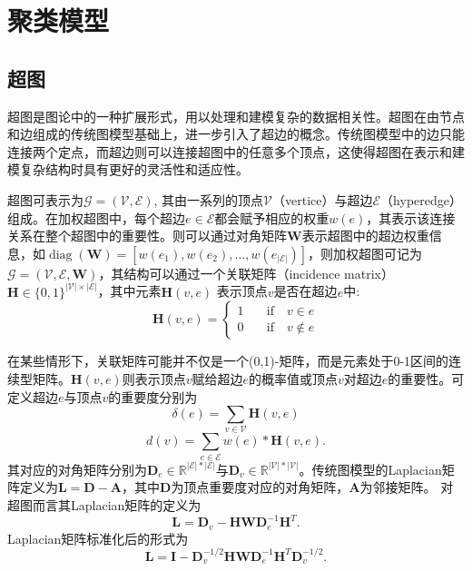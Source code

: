 \documentclass[lang=cn,10pt]{gorgeousnbook}
\numberwithin{equation}{section}%
\numberwithin{figure}{section}%
\begin{document}
\chapter{聚类模型}
\begin{center}
\end{center}
\section{超图}
超图是图论中的一种扩展形式，用以处理和建模复杂的数据相关性。超图在由节点和边组成的传统图模型基础上，进一步引入了超边的概念。传统图模型中的边只能连接两个定点，而超边则可以连接超图中的任意多个顶点，这使得超图在表示和建模复杂结构时具有更好的灵活性和适应性\cite{9264674}。

超图可表示为$\mathcal{G}=\left(\mathcal{V},\mathcal{E}\right)$, 其由一系列的顶点$\mathcal{V}$（vertice）与超边$\mathcal{E} $（hyperedge）组成。在加权超图中，每个超边$e\in\mathcal{E}$都会赋予相应的权重$w(e)$，其表示该连接关系在整个超图中的重要性。则可以通过对角矩阵$\mathbf{W}$表示超图中的超边权重信息，如$\operatorname{diag}(\mathbf{W})=[w(e_1),w(e_2),\ldots,w(e_{|\mathcal{E}|})]$，则加权超图可记为$\mathcal{G}=\left(\mathcal{V},\mathcal{E},\mathbf{W}\right)$，其结构可以通过一个关联矩阵（incidence matrix）$\mathbf{H}\in\{0,1\}^{|\mathcal{V}|\times|\mathcal{E}|}$，其中元素$\mathbf{H}(v,e)$ 表示顶点$v$是否在超边$e$中:
\begin{equation}
\mathbf{H}(v,e)=\left\{\begin{array}{cc}1&\quad\text{if}\quad v\in e\\0&\quad\text{if}\quad v\notin e\end{array}\right.
\end{equation}

在某些情形下，关联矩阵可能并不仅是一个(0,1)-矩阵，而是元素处于0-1区间的连续型矩阵。$\mathbf{H}(v,e)$则表示顶点$v$赋给超边$e$的概率值或顶点$v$对超边$e$的重要性。可定义超边$e$与顶点$v$的重要度分别为
\begin{equation}
\delta(e)=\sum_{v\in\mathcal{V}}\mathbf{H}(v,e)
\end{equation}
\begin{equation}
d(v)=\sum_{e\in\mathcal{E}}w(e)*\mathbf{H}(v,e).
\end{equation}
其对应的对角矩阵分别为$\mathbf{D}_e\in\mathbb{R}^{|\mathcal{E}|*|\mathcal{E}|}$与$\mathbf{D}_v\in\mathbb{R}^{|\mathcal{V}|*|\mathcal{V}|}$。传统图模型的Laplacian矩阵定义为$\mathbf{L} = \mathbf{D}-\mathbf{A}$，其中$\mathbf{D}$为顶点重要度对应的对角矩阵，$\mathbf{A}$为邻接矩阵。
对超图而言其Laplacian矩阵的定义为
\begin{equation}
\mathbf{L}=\mathbf{D}_v-\mathbf{H}\mathbf{W}\mathbf{D}_e^{-1}\mathbf{H}^T.
\end{equation}
Laplacian矩阵标准化后的形式为
\begin{equation}
\mathbf{L}=\mathbf{I}-\mathbf{D}_v^{-1/2}\mathbf{H}\mathbf{W}\mathbf{D}_e^{-1}\mathbf{H}^T\mathbf{D}_v^{-1/2}.
\end{equation}
\end{document}
